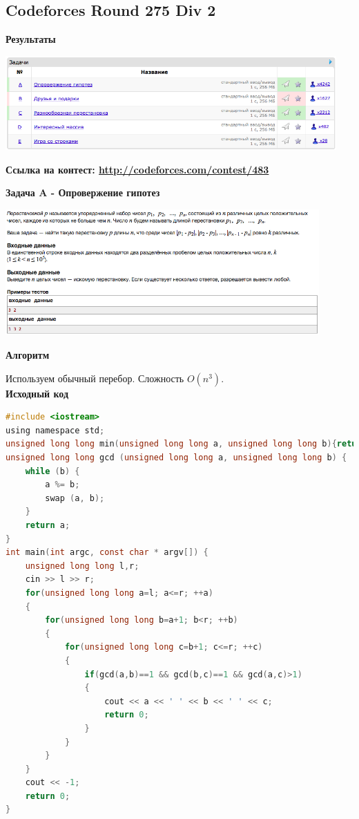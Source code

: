 \documentclass[a4paper,12pt]{article}
\begin{document}
%
%

\newpage
\subsection{Codeforces Round 275 Div 2}

\textbf{{\large Результаты}} \\
\begin{center}
\includegraphics[width=0.95\textwidth]{C_275/A_C_275_result.png}\\ [1cm]
\end{center}

\textbf{{\large Ссылка на контест: \url{http://codeforces.com/contest/483}}}

\newpage
\textbf{{\large Задача A - Опровержение гипотез}} \\
\begin{center}
\includegraphics[width=0.9\textwidth]{C_275/C_275_C.png}\\ [1cm]
\end{center}

\textbf{{\large Алгоритм}}

Используем обычный перебор. Сложность $O(n^3)$.\\

\textbf{{\large Исходный код}} \\
\begin{lstlisting}[language=C]
#include <iostream>
using namespace std;
unsigned long long min(unsigned long long a, unsigned long long b){return (a>b)?a:b;}
unsigned long long gcd (unsigned long long a, unsigned long long b) {
    while (b) {
        a %= b;
        swap (a, b);
    }
    return a;
}
int main(int argc, const char * argv[]) {
    unsigned long long l,r;
    cin >> l >> r;
    for(unsigned long long a=l; a<=r; ++a)
    {
        for(unsigned long long b=a+1; b<r; ++b)
        {
            for(unsigned long long c=b+1; c<=r; ++c)
            {
                if(gcd(a,b)==1 && gcd(b,c)==1 && gcd(a,c)>1)
                {
                    cout << a << ' ' << b << ' ' << c;
                    return 0;
                }
            }
        }
    }
    cout << -1;
    return 0;
}
\end{lstlisting}
\end{document}
